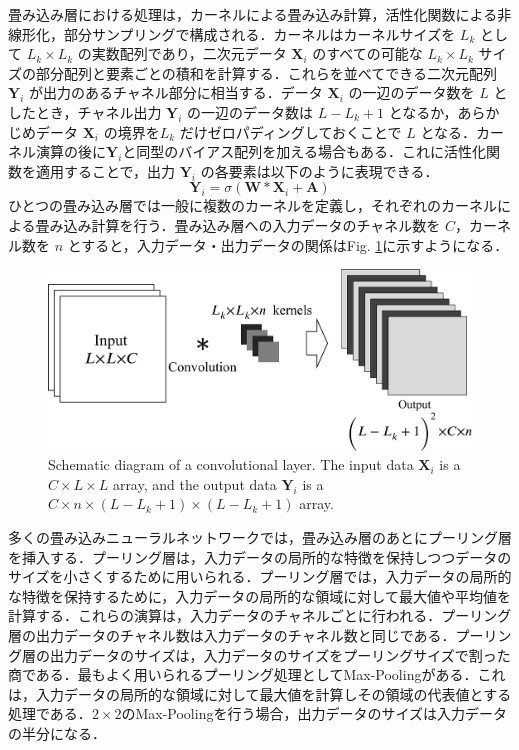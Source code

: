 畳み込み層における処理は，カーネルによる畳み込み計算，活性化関数による非線形化，部分サンプリングで構成される．カーネルはカーネルサイズを $L_{k}$ として $L_k \times L_k$ の実数配列であり，二次元データ $\bm{X}_i$ のすべての可能な $L_k \times L_k$ サイズの部分配列と要素ごとの積和を計算する．これらを並べてできる二次元配列 $\bm{Y}_i$ が出力のあるチャネル部分に相当する．データ $\bm{X}_i$ の一辺のデータ数を $L$ としたとき，チャネル出力 $\bm{Y}_i$ の一辺のデータ数は $L-L_k+1$ となるか，あらかじめデータ $\bm{X}_i$ の境界を$L_k$ だけゼロパディングしておくことで $L$ となる．カーネル演算の後に$\bm{Y}_i$と同型のバイアス配列を加える場合もある．これに活性化関数を適用することで，出力 $\bm{Y}_i$ の各要素は以下のように表現できる．
\begin{equation}
    \bm{Y}_i = \sigma \left( \bm{W} \ast \bm{X}_i + \bm{A} \right)
\end{equation}
ひとつの畳み込み層では一般に複数のカーネルを定義し，それぞれのカーネルによる畳み込み計算を行う．畳み込み層への入力データのチャネル数を $C$，カーネル数を $n$ とすると，入力データ・出力データの関係はFig. \ref{fig:convolutionalLayer}に示すようになる．
\begin{figure}[htbp]
    \centering
    \includegraphics[width=0.8\linewidth]{./Figure/2_Theory/cnn.pdf}
    \caption{Schematic diagram of a convolutional layer. The input data $\bm{X}_i$ is a $C\times L \times L$ array, and the output data $\bm{Y}_i$ is a $C\times n\times (L-L_k+1) \times (L-L_k+1)$ array.}
    \label{fig:convolutionalLayer}
\end{figure}

多くの畳み込みニューラルネットワークでは，畳み込み層のあとにプーリング層を挿入する．プーリング層は，入力データの局所的な特徴を保持しつつデータのサイズを小さくするために用いられる．プーリング層では，入力データの局所的な特徴を保持するために，入力データの局所的な領域に対して最大値や平均値を計算する．これらの演算は，入力データのチャネルごとに行われる．プーリング層の出力データのチャネル数は入力データのチャネル数と同じである．プーリング層の出力データのサイズは，入力データのサイズをプーリングサイズで割った商である．最もよく用いられるプーリング処理としてMax-Pooling\cite{nagi2011}がある．これは，入力データの局所的な領域に対して最大値を計算しその領域の代表値とする処理である．$2\times 2$のMax-Poolingを行う場合，出力データのサイズは入力データの半分になる．


